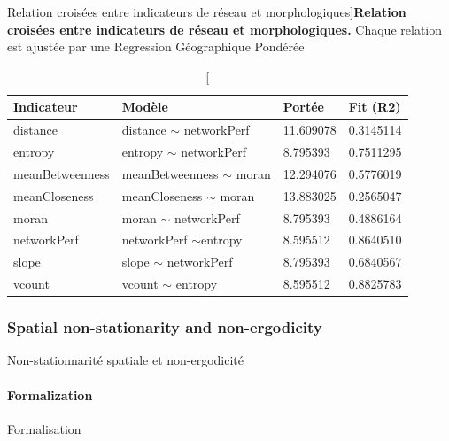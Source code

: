 

\begin{table}
\caption[][Relation croisées entre indicateurs de réseau et morphologiques]{}{\textbf{Relation croisées entre indicateurs de réseau et morphologiques.} Chaque relation est ajustée par une Regression Géographique Pondérée\label{tab:staticcorrelations:gwr}}
\begin{tabular}{|l|l|l|l|}
\hline
Indicateur & Modèle & Portée & Fit (R2) \\ \hline
distance & distance $\sim$ networkPerf & 11.609078 & 0.3145114 \\
entropy  & entropy $\sim$ networkPerf &  8.795393  &0.7511295 \\
meanBetweenness & meanBetweenness $\sim$ moran & 12.294076 & 0.5776019 \\
meanCloseness &  meanCloseness $\sim$ moran & 13.883025 & 0.2565047 \\
moran & moran $\sim$ networkPerf &  8.795393 & 0.4886164 \\
networkPerf & networkPerf $\sim$entropy & 8.595512  & 0.8640510 \\
slope & slope $\sim$ networkPerf & 8.795393  & 0.6840567 \\
vcount & vcount $\sim$ entropy & 8.595512  & 0.8825783 \\\hline
\end{tabular}
\end{table}



\subsubsection{Spatial non-stationarity and non-ergodicity}{Non-stationnarité spatiale et non-ergodicité}


\paragraph{Formalization}{Formalisation}

